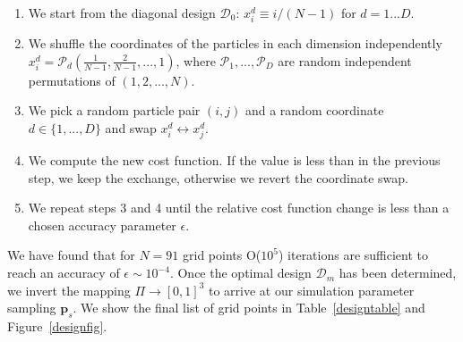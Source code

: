 \documentclass[reprint,aps,prd,superscriptaddress,showkeys,showpacs]{revtex4-1}
\begin{document}
\begin{enumerate}
\item We start from the diagonal design $\mathcal{D}_0$:
$x_i^d\equiv i/(N-1)$ for $d=1...D$.
\item We shuffle the coordinates of the particles in each dimension independently $x_i^d = \mathcal{P}_d\left(\frac{1}{N-1},\frac{2}{N-1},...,1\right)$, where $\mathcal{P}_1,...,\mathcal{P}_D$ are random independent permutations of $(1,2,...,N)$.
\item We pick a random particle pair $(i,j)$ and a random coordinate $d\in\{1,...,D\}$ and swap $x_i^d\leftrightarrow x_j^d$.
\item We compute the new cost function. If the value is less than in the previous step, we keep the exchange, otherwise we revert the coordinate swap.
\item We repeat steps 3 and 4 until the relative cost function change is less than a chosen accuracy parameter $\epsilon$.
\end{enumerate}
%

We have found that for $N=91$ grid points O($10^5$) iterations are
sufficient to reach an accuracy of $\epsilon\sim10^{-4}$. Once the
optimal design $\mathcal{D}_m$ has been determined, we invert the
mapping $\Pi\rightarrow[0,1]^3$ to arrive at our simulation parameter
sampling $\mathbf{p}_s$. We show the final list of grid points in
Table~\ref{designtable} and Figure~\ref{designfig}.
\end{document}
